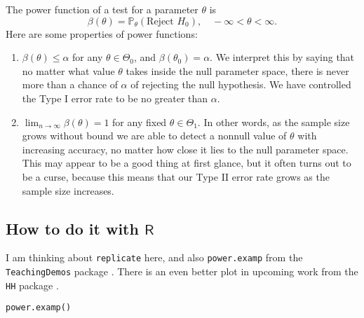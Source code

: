 The power function of a test for a parameter \(\theta\) is
\[
\beta(\theta)=\mathbb{P}_{\theta}(\mbox{Reject }H_{0}),\quad -\infty < \theta < \infty.
\]
Here are some properties of power functions:
\begin{enumerate}
\item \(\beta(\theta)\leq\alpha\) for any \(\theta\in\Theta_{0}\), and
\(\beta(\theta_{0})=\alpha\). We interpret this by saying that no
matter what value \(\theta\) takes inside the null parameter space,
there is never more than a chance of \(\alpha\) of rejecting the
null hypothesis. We have controlled the Type I error rate to be no
greater than \(\alpha\).
\item \(\lim_{n\to\infty}\beta(\theta)=1\) for any fixed
\(\theta\in\Theta_{1}\). In other words, as the sample size grows
without bound we are able to detect a nonnull value of \(\theta\)
with increasing accuracy, no matter how close it lies to the null
parameter space. This may appear to be a good thing at first
glance, but it often turns out to be a curse, because this means
that our Type II error rate grows as the sample size increases.
\end{enumerate}

\subsection{How to do it with \(\mathsf{R}\)}
\label{sec-10-7-1}

I am thinking about \texttt{replicate} 
here, and also \texttt{power.examp} 
from the \texttt{TeachingDemos} package \cite{TeachingDemos}. There is an
even better plot in upcoming work from the \texttt{HH} package \cite{HH}.

\begin{verbatim}
power.examp()
\end{verbatim}

